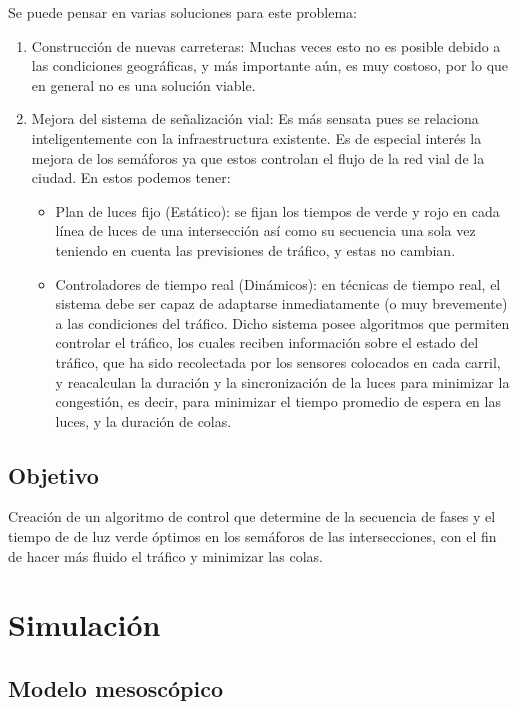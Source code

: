 \documentclass[colorinlistoftodos,twoside,twocolumn]{article} %
\begin{document}
	\vspace{0.5em}
	Se puede pensar en varias soluciones para este problema:
	\begin{enumerate}
		\item Construcción de nuevas carreteras: Muchas veces esto no es posible debido a las condiciones geográficas, y más importante aún, es muy costoso, por lo que en general no es una solución viable.
		\item Mejora del sistema de señalización vial: Es más sensata pues se relaciona inteligentemente con la infraestructura existente. Es de especial interés la mejora de los semáforos ya que estos controlan el flujo de la red vial de la ciudad. En estos podemos tener:
		\begin{itemize}
			\item Plan de luces fijo (Estático): se fijan los tiempos de verde y rojo en cada línea de luces de una intersección así como su secuencia una sola vez teniendo en cuenta las previsiones de tráfico, y estas no cambian.
			\item Controladores de tiempo real (Dinámicos): en técnicas de tiempo real, el sistema debe ser capaz de adaptarse inmediatamente (o muy brevemente) a las condiciones del tráfico. Dicho sistema posee algoritmos que permiten controlar el tráfico, los cuales reciben información sobre el estado del tráfico, que ha sido recolectada por los sensores colocados en cada carril, y reacalculan la duración y la sincronización de la luces para minimizar la congestión, es decir, para minimizar el tiempo promedio de espera en las luces, y la duración de colas.
		\end{itemize} 
	\end{enumerate}

	\subsection{Objetivo}
	
	Creación de un algoritmo de control que determine de la secuencia de fases y el tiempo de de luz verde óptimos en los semáforos de las intersecciones, con el fin de hacer más fluido el tráfico y minimizar las colas.
	
	\section{Simulación}
	
	\subsection{Modelo mesosc\'opico}
	
\end{document}
